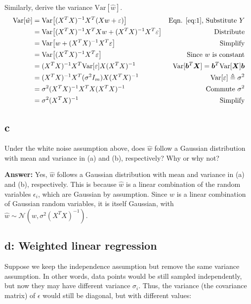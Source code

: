 \documentclass{article}
\begin{document}
Similarly, derive the variance $\text{Var}\left[\hat{w}\right]$.
\begin{align*}
    \text{Var}\left[\hat{w}\right] &= \text{Var}\left[(X^TX)^{-1}X^T\left(Xw + \epsilon\right)\right]&\text{Eqn. \ref{eq:1}, Substitute $Y$}\\
    &= \text{Var}\left[(X^TX)^{-1}X^TXw + (X^TX)^{-1}X^T\epsilon\right]&\text{Distribute}\\
    &= \text{Var}\left[w + (X^TX)^{-1}X^T\epsilon\right]&\text{Simplify}\\
    &= \text{Var}\left[(X^TX)^{-1}X^T\epsilon\right]&\text{Since $w$ is constant}\\
    &= (X^TX)^{-1}X^T\text{Var}\left[\epsilon\right]X(X^TX)^{-1}&\text{$\text{Var}[\vct{b}^T\mtx{X}] = \vct{b}^T\text{Var}[\mtx{X}]\vct{b}$}\\
    &= (X^TX)^{-1}X^T(\sigma^2I_m)X(X^TX)^{-1}&\text{$\text{Var}\left[\epsilon\right] \triangleq \sigma^2$}\\
    &= \sigma^2(X^TX)^{-1}X^TX(X^TX)^{-1}&\text{Commute $\sigma^2$}\\
    &= \sigma^2(X^TX)^{-1}&\text{Simplify}\\
\end{align*}

\subsection{c}

Under the white noise assumption above, does $\hat{w}$ follow a Gaussian distribution with mean and variance in (a) and (b), respectively?
Why or why not?

\textbf{Answer:} Yes, $\hat{w}$ follows a Gaussian distribution with mean and variance in (a) and (b), respectively.
This is because $\hat{w}$ is a linear combination of the random variables $\epsilon_i$, which are Gaussian by assumption.
Since $\hat{w}$ is a linear combination of Gaussian random variables, it is itself Gaussian, with $\hat{w} \sim \mathcal{N}(w, \sigma^2(X^TX)^{-1})$.

\subsection{d: Weighted linear regression}
Suppose we keep the independence assumption but remove the same variance assumption.
In other words, data points would be still sampled independently, but now they may have different variance $\sigma_i$.
Thus, the variance (the covariance matrix) of $\epsilon$ would still be diagonal, but with different values:
\end{document}
